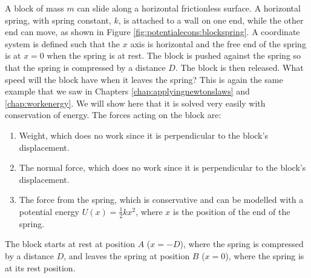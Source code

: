 \begin{example}{\label{ex:potentialecons:blockspring}
A block of mass $m$ can slide along a horizontal frictionless surface. A horizontal spring, with spring constant, $k$, is attached to a wall on one end, while the other end can move, as shown in Figure \ref{fig:potentialecons:blockspring}. A coordinate system is defined such that the $x$ axis is horizontal and the free end of the spring is at $x=0$ when the spring is at rest. The block is pushed against the spring so that the spring is compressed by a distance $D$. The block is then released. What speed will the block have when it leaves the spring?}
This is again the same example that we saw in Chapters \ref{chap:applyingnewtonslaws} and \ref{chap:workenergy}. We will show here that it is solved very easily with conservation of energy. The forces acting on the block are:
\begin{enumerate}
\item Weight, which does no work since it is perpendicular to the block's displacement.
\item The normal force, which does no work since it is perpendicular to the block's displacement.
\item The force from the spring, which is conservative and can be modelled with a potential energy $U(x)=\frac{1}{2}kx^2$, where $x$ is the position of the end of the spring.
\end{enumerate}

The block starts at rest at position $A$ ($x=-D$), where the spring is compressed by a distance $D$, and leaves the spring at position $B$ ($x=0$), where the spring is at its rest position. 


\end{example}

